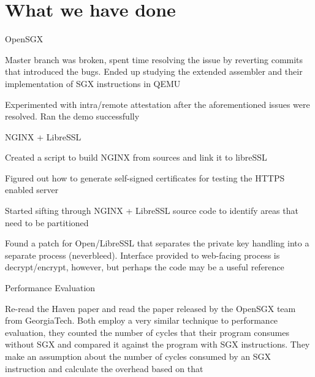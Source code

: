 \documentclass[11pt,agenda]{meetingmins}
\begin{document}
	\maketitle
	\section{What we have done}
		\begin{items}
			\item OpenSGX
			\begin{items}
				\item Master branch was broken, spent time resolving the issue by reverting commits that introduced the bugs. Ended up studying the extended assembler and their implementation of SGX instructions in QEMU
				\item Experimented with intra/remote attestation after the aforementioned issues were resolved. Ran the demo successfully 
			\end{items}
			\item NGINX + LibreSSL
			\begin{items}
				\item Created a script to build NGINX from sources and link it to libreSSL
				\item Figured out how to generate self-signed certificates for testing the HTTPS enabled server
				\item Started sifting through NGINX + LibreSSL source code to identify areas that need to be partitioned
				\item Found a patch for Open/LibreSSL that separates the private key handling into a separate process (neverbleed). Interface provided to web-facing process is decrypt/encrypt, however, but perhaps the code may be a useful reference	  
			\end{items}
			\item Performance Evaluation
			\begin{items}
				\item Re-read the Haven paper and read the paper released by the OpenSGX team from GeorgiaTech. Both employ a very similar technique to performance evaluation, they counted the number of cycles that their program consumes without SGX and compared it against the program with SGX instructions. They make an assumption about the number of cycles consumed by an SGX instruction and calculate the overhead based on that
			\end{items}
		\end{items}
\end{document}
